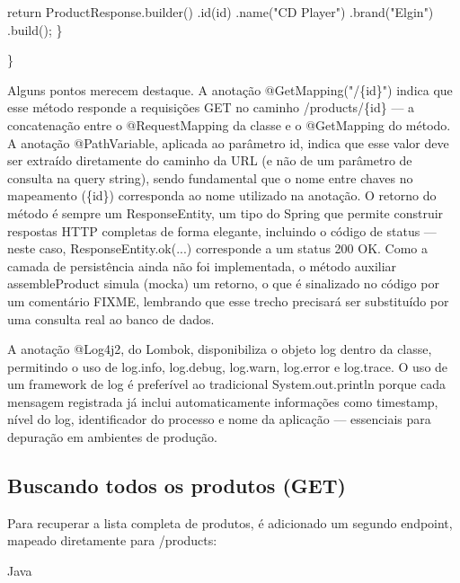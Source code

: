 \begin{infobox}{return ProductResponse.builder()}
.id(id) .name("CD Player") .brand("Elgin") .build(); \}
\end{infobox}

\}

Alguns pontos merecem destaque. A anotação @GetMapping("/\{id\}") indica que esse método responde a requisições GET no caminho /products/\{id\} — a concatenação entre o @RequestMapping da classe e o @GetMapping do método. A anotação @PathVariable, aplicada ao parâmetro id, indica que esse valor deve ser extraído diretamente do caminho da URL (e não de um parâmetro de consulta na query string), sendo fundamental que o nome entre chaves no mapeamento (\{id\}) corresponda ao nome utilizado na anotação. O retorno do método é sempre um ResponseEntity, um tipo do Spring que permite construir respostas HTTP completas de forma elegante, incluindo o código de status — neste caso, ResponseEntity.ok(...) corresponde a um status 200 OK. Como a camada de persistência ainda não foi implementada, o método auxiliar assembleProduct simula (mocka) um retorno, o que é sinalizado no código por um comentário FIXME, lembrando que esse trecho precisará ser substituído por uma consulta real ao banco de dados.

A anotação @Log4j2, do Lombok, disponibiliza o objeto log dentro da classe, permitindo o uso de log.info, log.debug, log.warn, log.error e log.trace. O uso de um framework de log é preferível ao tradicional System.out.println porque cada mensagem registrada já inclui automaticamente informações como timestamp, nível do log, identificador do processo e nome da aplicação — essenciais para depuração em ambientes de produção.

\subsection{Buscando todos os produtos (GET)}

Para recuperar a lista completa de produtos, é adicionado um segundo endpoint, mapeado diretamente para /products:

\begin{codebox}{Java}

\end{codebox}

\begin{codebox}{@Operation(}
summary = "Find all products",
description = "Retrieve all products from the Blue Velvet Music Store"
)
@GetMapping
public ResponseEntity<List<ProductResponse>> getProducts() {
log.info("Request received to fetch all products");
\end{codebox}

